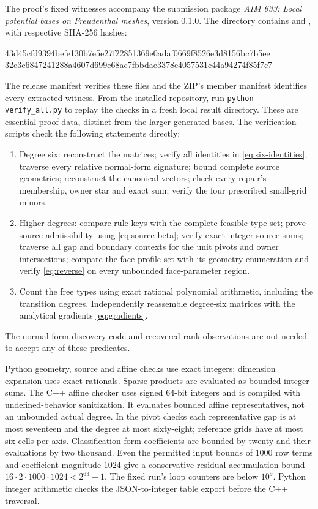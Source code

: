 \documentclass[11pt]{article}
\theoremstyle{remark}
\begin{document}
The proof's fixed witnesses accompany the submission package
\emph{AIM 633: Local potential bases on Freudenthal meshes}, version 0.1.0.
The directory  contains
 and ,
with respective SHA-256 hashes:
\begin{center}\small\ttfamily
43d45cfd9394befe130b7e5e27f22851369e0adaf0669f8526e3d8156bc7b5ee\\
32c3c6847241288a4607d699e68ac7fbbdae3378e4057531c44a94274f85f7c7
\end{center}
The release manifest verifies these files and the ZIP's member manifest
identifies every extracted witness. From the installed repository, run
\texttt{python verify\_all.py} to replay the checks in a fresh local result
directory. These are essential proof data, distinct from the larger generated
bases. The verification scripts check the following statements directly:
\begin{enumerate}
\item Degree six: reconstruct the matrices; verify all identities in
\eqref{eq:six-identities}; traverse every relative normal-form signature;
bound complete source geometries; reconstruct the canonical vectors;
check every repair's membership, owner star and exact sum; verify the
four prescribed small-grid minors.
\item Higher degrees: compare rule keys with the complete feasible-type
set; prove source admissibility using \eqref{eq:source-beta}; verify exact
integer source sums; traverse all gap and boundary contexts for the unit
pivots and owner intersections; compare the face-profile set with its
geometry enumeration and verify \eqref{eq:reverse} on every unbounded
face-parameter region.
\item Count the free types using exact rational polynomial arithmetic,
including the transition degrees. Independently reassemble degree-six
matrices with the analytical gradients \eqref{eq:gradients}.
\end{enumerate}
The normal-form discovery code and recovered rank observations are not
needed to accept any of these predicates.

Python geometry, source and affine checks use exact integers; dimension
expansion uses exact rationals. Sparse products are evaluated as bounded
integer sums. The C++ affine checker uses signed 64-bit integers and
is compiled with undefined-behavior sanitization. It evaluates bounded
affine representatives, not an unbounded actual degree. In the pivot
checks each representative gap is at most seventeen and the degree at
most sixty-eight; reference grids have at most six cells per axis.
Classification-form coefficients are bounded by twenty and their
evaluations by two thousand. Even the permitted input bounds of $1000$
row terms and coefficient magnitude $1024$ give a conservative residual
accumulation bound $16\cdot2\cdot1000\cdot1024<2^{63}-1$. The fixed
run's loop counters are below $10^9$. Python integer arithmetic checks
the JSON-to-integer table export before the C++ traversal.
\end{document}

